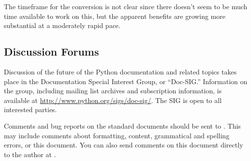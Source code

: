 \documentclass{howto}
\begin{document}
    The timeframe for the conversion is not clear since there doesn't
    seem to be much time available to work on this, but the apparent
    benefits are growing more substantial at a moderately rapid pace.


  \subsection{Discussion Forums \label{discussion}}

    Discussion of the future of the Python documentation and related
    topics takes place in the Documentation Special Interest Group, or
    ``Doc-SIG.''  Information on the group, including mailing list
    archives and subscription information, is available at
    \url{http://www.python.org/sigs/doc-sig/}.  The SIG is open to all
    interested parties.

    Comments and bug reports on the standard documents should be sent
    to .  This may include comments
    about formatting, content, grammatical and spelling errors, or
    this document.  You can also send comments on this document
    directly to the author at .


\end{document}
